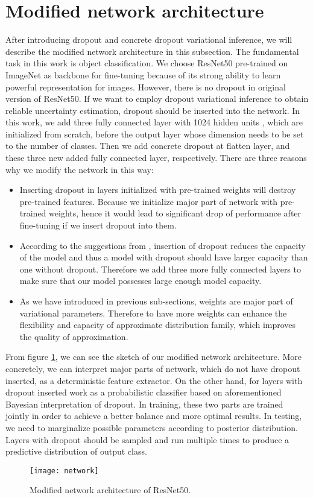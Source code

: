 \section{Modified network architecture}
After introducing dropout and concrete dropout variational inference, we will describe the modified network architecture in this subsection. The fundamental task in this work is object classification. We choose ResNet50\cite{he2016deep} pre-trained on ImageNet as backbone for fine-tuning because of its strong ability to learn powerful representation for images. However, there is no dropout in original version of ResNet50. If we want to employ dropout variational inference to obtain reliable uncertainty estimation, dropout should be inserted into the network. In this work, we add three fully connected layer with 1024 hidden units , which are initialized from scratch, before the output layer whose dimension needs to be set to the number of classes. Then we add concrete dropout at flatten layer, and these three new added fully connected layer, respectively.
There are three reasons why we modify the network in this way:
\begin{itemize}
	\item Inserting dropout in layers initialized with pre-trained weights will destroy pre-trained features. Because we initialize major part of network with pre-trained weights, hence it would lead to significant drop of performance after fine-tuning if we insert dropout into them. 
	\item According to the suggestions from \cite{srivastava2014dropout}, insertion of dropout reduces the capacity of the model and thus a model with	dropout should have larger capacity than one without dropout. Therefore we add three more fully connected layers to make sure that our model possesses large enough model capacity.
	\item As we have introduced in previous sub-sections, weights are major part of variational parameters. Therefore to have more weights can enhance the flexibility and capacity of approximate distribution family, which improves the quality of approximation.  
\end{itemize}

From figure \ref{fig:modified_net}, we can see the sketch of our modified network architecture. More concretely, we can interpret major parts of network, which do not have dropout inserted, as a deterministic feature extractor. On the other hand, for layers with dropout inserted work as a probabilistic classifier based on aforementioned Bayesian interpretation of dropout. In training, these two parts are trained jointly in order to achieve a better balance and more optimal results. In testing, we need to marginalize possible parameters according to posterior distribution. Layers with dropout should be sampled and run multiple times to produce a predictive distribution of output class.
\begin{figure}[H]
	\begin{center}
		\texttt{[image: network]}
		\caption{Modified network architecture of ResNet50.}		
		\label{fig:modified_net}
	\end{center}
\end{figure}

